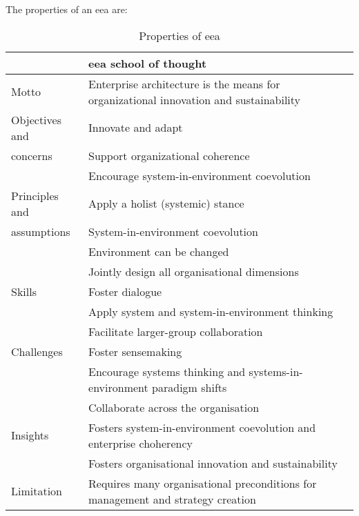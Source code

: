 The properties of an \acrshort{eea} are:

\begin{small}
\begin{longtable}{p{}p{}}
	\toprule
	& \textbf{\acrlong{eea} school of thought} \\ \midrule%
	\endhead%
	\hline
	\caption{Properties of \acrlong{eea} \parencite[p. 39]{Lapalme2012}}
	\label{tab:eaeea}	
	\endfoot%
	Motto    		& Enterprise architecture is the means for organizational innovation and sustainability \\
	Objectives and 	& Innovate and adapt    \\
	concerns		& Support organizational coherence \\
					& Encourage system-in-environment coevolution \\
	Principles and  & Apply a holist (systemic) stance \\
	assumptions		& System-in-environment coevolution  \\
					& Environment can be changed \\
					& Jointly design all organisational dimensions \\
	Skills 			& Foster dialogue \\
					& Apply system and system-in-environment thinking \\
					& Facilitate larger-group collaboration \\
	Challenges		& Foster sensemaking \\
					& Encourage systems thinking and systems-in-environment paradigm shifts \\
					& Collaborate across the organisation \\
	Insights		& Fosters system-in-environment coevolution and enterprise choherency \\
					& Fosters organisational innovation and sustainability \\
	Limitation		& Requires many organisational preconditions for management and strategy creation \\
	\bottomrule
\end{longtable}
\end{small}